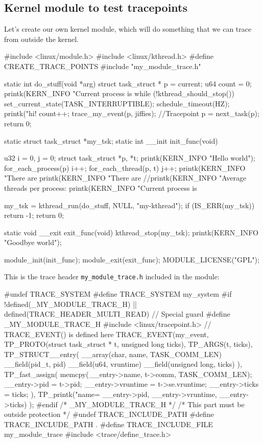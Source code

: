 \subsection{Kernel module to test tracepoints}
\label{sec:module}
Let's create our own kernel module, which will do something that we can trace from outside the kernel.
\begin{code}
#include <linux/module.h>
#include <linux/kthread.h>
#define CREATE_TRACE_POINTS
#include "my_module_trace.h"

static int do_stuff(void *arg){
	struct task_struct * p = current;
	u64 count = 0;
	printk(KERN_INFO "Current process is %
	while (!kthread_should_stop()){
		set_current_state(TASK_INTERRUPTIBLE);
		schedule_timeout(HZ);
		printk("hi! %
		count++;
		trace_my_event(p, jiffies); //Tracepoint
		p = next_task(p);
	}
	return 0;
}

static struct task_struct *my_tsk;
static int __init init_func(void){
	u32 i = 0, j = 0;
	struct task_struct *p, *t;
	printk(KERN_INFO "Hello world\n");
	for_each_process(p){
		i++;
		for_each_thread(p, t){
			j++;
		}
	}
	printk(KERN_INFO "There are %
	printk(KERN_INFO "There are %
	//printk(KERN_INFO "Average threads per process: %
	printk(KERN_INFO "Current process is %
	
	my_tsk = kthread_run(do_stuff, NULL, "my-kthread");
	if (IS_ERR(my_tsk))
		return -1;
	return 0;
}

static void __exit exit_func(void){
	kthread_stop(my_tsk);
	printk(KERN_INFO "Goodbye world\n");
}

module_init(init_func);
module_exit(exit_func);
MODULE_LICENSE("GPL");
\end{code}
This is the trace header \verb|my_module_trace.h| included in the module:
\begin{code}
#undef TRACE_SYSTEM
#define TRACE_SYSTEM my_system
#if !defined(_MY_MODULE_TRACE_H) || defined(TRACE_HEADER_MULTI_READ) // Special guard
#define _MY_MODULE_TRACE_H
#include <linux/tracepoint.h> // TRACE_EVENT() is defined here
TRACE_EVENT(my_event,
	TP_PROTO(struct task_struct * t, unsigned long ticks),
	TP_ARGS(t, ticks),
	TP_STRUCT__entry(
		__array(char, name, TASK_COMM_LEN)
		__field(pid_t, pid)
		__field(u64, vruntime)
		__field(unsigned long, ticks)
	),
	TP_fast_assign(
		memcpy(__entry->name, t->comm, TASK_COMM_LEN);
		__entry->pid	= t->pid;
		__entry->vruntime = t->se.vruntime;
		__entry->ticks = ticks;
	),
	TP_printk("name=%
	__entry->pid, __entry->vruntime, __entry->ticks)
);
#endif /* _MY_MODULE_TRACE_H */
/* This part must be outside protection */
#undef TRACE_INCLUDE_PATH
#define TRACE_INCLUDE_PATH .
#define TRACE_INCLUDE_FILE my_module_trace
#include <trace/define_trace.h>
\end{code}
